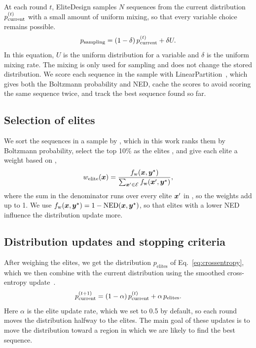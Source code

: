 At each round $t$, EliteDesign samples $N$ sequences from the current distribution $p_{\mathrm{current}}^{(t)}$ with a small amount of uniform mixing, so that every variable choice remains possible.
\begin{equation}
p_{\mathrm{sampling}}=(1-\delta)\,p_{\mathrm{current}}^{(t)}+\delta U.
\label{eq:sampling}
\end{equation}
In this equation, $U$ is the uniform distribution for a variable and $\delta$ is the uniform mixing rate. The mixing is only used for sampling and does not change the stored distribution. We score each sequence in the sample with LinearPartition~\citep{zhang2020}, which gives both the Boltzmann probability and NED, cache the scores to avoid scoring the same sequence twice, and track the best sequence found so far.


\subsection{Selection of elites}\label{sec:elites}
We sort the sequences in a sample by \frank, which in this work ranks them by Boltzmann probability, select the top 10\% as the elites \ELITES, and give each elite \vecx a weight based on \fweight,
\begin{equation}
w_{\mathrm{elite}}(\boldsymbol{{x}})=\frac{f_{\mathrm{w}}(\boldsymbol{{x}},\boldsymbol{{y}}^\star)}{\sum_{\boldsymbol{{x}}'\in\mathcal{E}}f_{\mathrm{w}}(\boldsymbol{{x}}',\boldsymbol{{y}}^\star)},
\label{eq:weights}
\end{equation}
where the sum in the denominator runs over every elite $\boldsymbol{{x}}'$ in \ELITES, so the weights add up to 1. We use $f_{\mathrm{w}}(\boldsymbol{{x}},\boldsymbol{{y}}^\star)=1-\text{NED}(\boldsymbol{{x}},\boldsymbol{{y}}^\star)$, so that elites with a lower NED influence the distribution update more.

\subsection{Distribution updates and stopping criteria}\label{sec:update}
After weighing the elites, we get the distribution $p_{\mathrm{elites}}$ of Eq.~\ref{eq:crossentropy}, which we then combine with the current distribution using the smoothed cross-entropy update~\citep{deboer2005}.
\begin{equation}
p_{\mathrm{current}}^{(t+1)}=(1-\alpha)\,p_{\mathrm{current}}^{(t)}+\alpha\,p_{\mathrm{elites}}.
\label{eq:update}
\end{equation}
Here $\alpha$ is the elite update rate, which we set to 0.5 by default, so each round moves the distribution halfway to the elites. The main goal of these updates is to move the distribution toward a region in which we are likely to find the best sequence.


